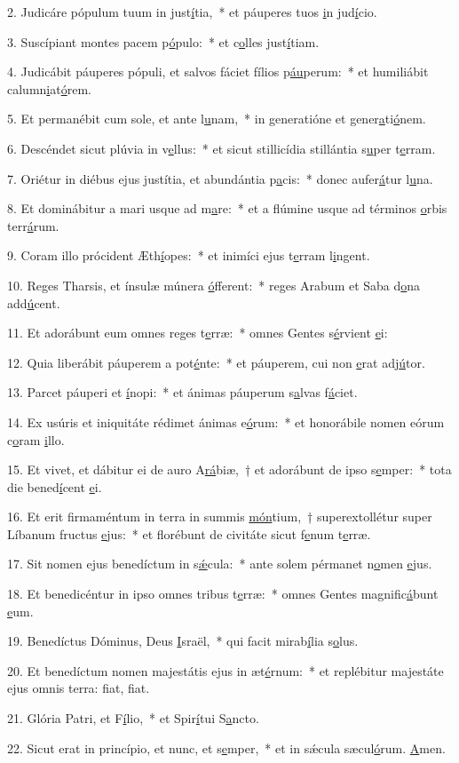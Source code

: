 2. Judicáre pópulum tuum in just\uline{í}tia,~* et páuperes tuos \uline{i}n jud\uline{í}cio.\par 
3. Suscípiant montes pacem p\uline{ó}pulo:~* et c\uline{o}lles just\uline{í}tiam.\par 
4. Judicábit páuperes pópuli, et salvos fáciet fílios p\uline{áu}perum:~* et humiliábit calumn\uline{i}at\uline{ó}rem.\par 
5. Et permanébit cum sole, et ante l\uline{u}nam,~* in generatióne et gener\uline{a}ti\uline{ó}nem.\par 
6. Descéndet sicut plúvia in v\uline{e}llus:~* et sicut stillicídia stillántia s\uline{u}per t\uline{e}rram.\par 
7. Oriétur in diébus ejus justítia, et abundántia p\uline{a}cis:~* donec aufer\uline{á}tur l\uline{u}na.\par 
8. Et dominábitur a mari usque ad m\uline{a}re:~* et a flúmine usque ad términos \uline{o}rbis terr\uline{á}rum.\par 
9. Coram illo prócident Æth\uline{í}opes:~* et inimíci ejus t\uline{e}rram l\uline{i}ngent.\par 
10. Reges Tharsis, et ínsulæ múnera \uline{ó}fferent:~* reges Arabum et Saba d\uline{o}na add\uline{ú}cent.\par 
11. Et adorábunt eum omnes reges t\uline{e}rræ:~* omnes Gentes s\uline{é}rvient \uline{e}i:\par 
12. Quia liberábit páuperem a pot\uline{é}nte:~* et páuperem, cui non \uline{e}rat adj\uline{ú}tor.\par 
13. Parcet páuperi et \uline{í}nopi:~* et ánimas páuperum s\uline{a}lvas f\uline{á}ciet.\par 
14. Ex usúris et iniquitáte rédimet ánimas e\uline{ó}rum:~* et honorábile nomen eórum c\uline{o}ram \uline{i}llo.\par 
15. Et vivet, et dábitur ei de auro A\uline{rá}biæ,~† et adorábunt de ipso s\uline{e}mper:~* tota die bened\uline{í}cent \uline{e}i.\par 
16. Et erit firmaméntum in terra in summis \uline{món}tium,~† superextollétur super Líbanum fructus \uline{e}jus:~* et florébunt de civitáte sicut f\uline{e}num t\uline{e}rræ.\par 
17. Sit nomen ejus benedíctum in s\uline{ǽ}cula:~* ante solem pérmanet n\uline{o}men \uline{e}jus.\par 
18. Et benedicéntur in ipso omnes tribus t\uline{e}rræ:~* omnes Gentes magnific\uline{á}bunt \uline{e}um.\par 
19. Benedíctus Dóminus, Deus \uline{I}sraël,~* qui facit mirab\uline{í}lia s\uline{o}lus.\par 
20. Et benedíctum nomen majestátis ejus in æt\uline{é}rnum:~* et replébitur majestáte ejus omnis terra: f\uline{i}at, f\uline{i}at.\par 
21. Glória Patri, et F\uline{í}lio,~* et Spir\uline{í}tui S\uline{a}ncto.\par 
22. Sicut erat in princípio, et nunc, et s\uline{e}mper,~* et in sǽcula sæcul\uline{ó}rum. \uline{A}men.\par 
